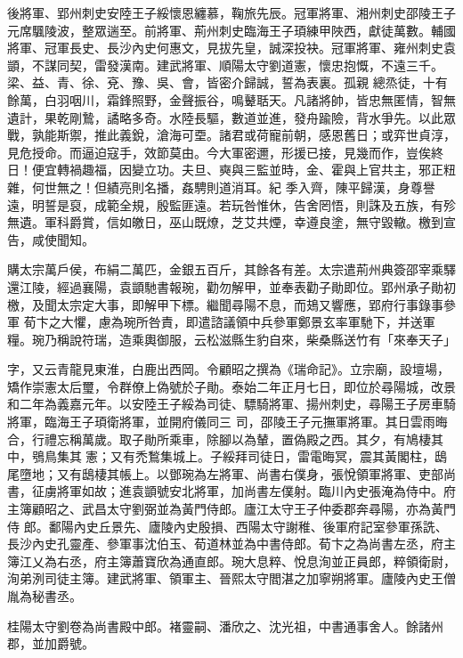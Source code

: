 \begin{pinyinscope}
 後將軍、郢州刺史安陸王子綏懷恩纏慕，鞠旅先辰。冠軍將軍、湘州刺史邵陵王子元席颿陵波，整眾遄至。前將軍、荊州刺史臨海王子頊練甲陜西，獻徒萬數。輔國將軍、冠軍長史、長沙內史何惠文，見拔先皇，誠深投袂。冠軍將軍、雍州刺史袁顗，不謀同契，雷發漢南。建武將軍、順陽太守劉道憲，懷忠抱慨，不遠三千。梁、益、青、徐、兗、豫、吳、會，皆密介歸誠，誓為表裏。孤親
 總烝徒，十有餘萬，白羽咽川，霜鋒照野，金聲振谷，鳴鼙聒天。凡諸將帥，皆忠無匿情，智無遺計，果乾剛鷙，譎略多奇。水陸長驅，數道並進，發舟踰險，背水爭先。以此眾戰，孰能斯禦，推此義銳，滄海可垔。諸君或荷寵前朝，感恩舊日；或弈世貞淳，見危授命。而逼迫寇手，效節莫由。今大軍密邇，形援已接，見幾而作，豈俟終日！便宜轉禍趣福，因變立功。夫旦、奭與三監並時，金、霍與上官共主，邪正粈雜，何世無之！但績亮則名播，姦騁則道消耳。紀
 季入齊，陳平歸漢，身尊譽遠，明誓是裒，成範全規，殷監匪遠。若玩咎惟休，告舍罔悟，則誅及五族，有殄無遺。軍科爵賞，信如皦日，巫山既燎，芝艾共煙，幸遵良塗，無守毀轍。檄到宣告，咸使聞知。



 購太宗萬戶侯，布絹二萬匹，金銀五百斤，其餘各有差。太宗遣荊州典簽邵宰乘驛還江陵，經過襄陽，袁顗馳書報琬，勸勿解甲，並奉表勸子勛即位。郢州承子勛初檄，及聞太宗定大事，即解甲下標。繼聞尋陽不息，而鳷又響應，郢府行事錄事參軍
 荀卞之大懼，慮為琬所咎責，即遣諮議領中兵參軍鄭景玄率軍馳下，并送軍糧。琬乃稱說符瑞，造乘輿御服，云松滋縣生豹自來，柴桑縣送竹有「來奉天子」



 字，又云青龍見東淮，白鹿出西岡。令顧昭之撰為《瑞命記》。立宗廟，設壇場，矯作崇憲太后璽，令群僚上偽號於子勛。泰始二年正月七日，即位於尋陽城，改景和二年為義嘉元年。以安陸王子綏為司徒、驃騎將軍、揚州刺史，尋陽王子房車騎將軍，臨海王子頊衛將軍，並開府儀同三
 司，邵陵王子元撫軍將軍。其日雲雨晦合，行禮忘稱萬歲。取子勛所乘車，除腳以為輦，置偽殿之西。其夕，有鳩棲其中，鴞鳥集其憲；又有禿鶖集城上。子綏拜司徒日，雷電晦冥，震其黃閣柱，鴟尾墮地；又有鴟棲其帳上。以鄧琬為左將軍、尚書右僕身，張悅領軍將軍、吏部尚書，征虜將軍如故；進袁顗號安北將軍，加尚書左僕射。臨川內史張淹為侍中。府主簿顧昭之、武昌太守劉弼並為黃門侍郎。廬江太守王子仲委郡奔尋陽，亦為黃門侍
 郎。鄱陽內史丘景先、廬陵內史殷損、西陽太守謝稚、後軍府記室參軍孫詵、長沙內史孔靈產、參軍事沈伯玉、荀道林並為中書侍郎。荀卞之為尚書左丞，府主簿江乂為右丞，府主簿蕭寶欣為通直郎。琬大息粹、悅息洵並正員郎，粹領衛尉，洵弟洌司徒主簿。建武將軍、領軍主、晉熙太守閻湛之加寧朔將軍。廬陵內史王僧胤為秘書丞。



 桂陽太守劉卷為尚書殿中郎。褚靈嗣、潘欣之、沈光祖，中書通事舍人。餘諸州郡，並加爵號。




\end{pinyinscope}
